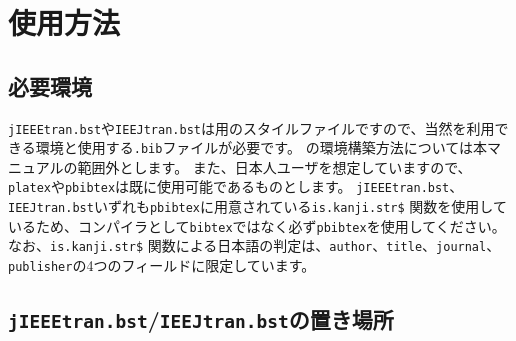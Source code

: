 \documentclass[10pt, a4paper]{jsarticle}
\renewcommand{\refname}{\small 参考文献}
\begin{document}
\begin{bibunit}[IEEJtran]
  \nocite{Incollection,jpIncollection1,jpIncollection2,enIncollection1}
  \renewcommand{\refname}{\small 参考文献(IEEJtran.bst)}
  {\small \putbib[./incollection]}
\end{bibunit}
\begin{bibunit}[jIEEEtran]
  \nocite{Incollection,jpIncollection1,jpIncollection2,enIncollection1}
  \renewcommand{\refname}{\small 参考文献(jIEEEtran.bst)}
  {\small \putbib[./incollection]}
\end{bibunit}
\begin{bibunit}[IEEJtran]
  \nocite{enIncollection1/ej/jpIncollection1}
  \renewcommand{\refname}{\small 英日を併記した参考文献(IEEJtran.bst)}
  {\small \putbib[./incollection]}
\end{bibunit}
\begin{bibunit}[jIEEEtran]
  \nocite{enIncollection1/ej/jpIncollection1}
  \renewcommand{\refname}{\small 英日を併記した参考文献(jIEEEtran.bst)}
  {\small \putbib[./incollection]}
\end{bibunit}




\section{使用方法}

\subsection{必要環境}

\texttt{jIEEEtran.bst}や\texttt{IEEJtran.bst}は\BibTeX 用のスタイルファイルですので、当然\BibTeX を利用できる環境と使用する\texttt{.bib}ファイルが必要です。
\BibTeX の環境構築方法については本マニュアルの範囲外とします。
また、日本人ユーザを想定していますので、\texttt{platex}や\texttt{pbibtex}は既に使用可能であるものとします。
\texttt{jIEEEtran.bst}、\texttt{IEEJtran.bst}いずれも\texttt{pbibtex}に用意されている\texttt{is.kanji.str\$} 関数を使用しているため、\BibTeX コンパイラとして\texttt{bibtex}ではなく必ず\texttt{pbibtex}を使用してください。
なお、\texttt{is.kanji.str\$} 関数による日本語の判定は、\texttt{author}、\texttt{title}、\texttt{journal}、\texttt{publisher}の4つのフィールドに限定しています。



\subsection{\texttt{jIEEEtran.bst}/\texttt{IEEJtran.bst}の置き場所}
\end{document}
